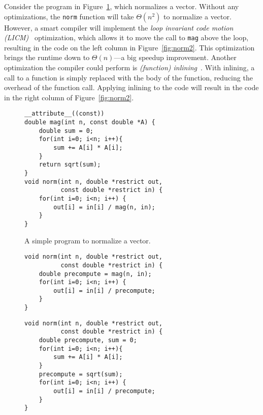 Consider the program in Figure~\ref{fig:norm1}, which normalizes a vector. Without any optimizations, the \verb|norm| function will take $\Theta(n^2)$ to normalize a vector. However, a smart compiler will implement the \textit{loop invariant code motion (LICM)}~\cite{Muchnick97} optimization, which allows it to move the call to \verb|mag| above the loop, resulting in the code on the left column in Figure~\ref{fig:norm2}. This optimization brings the runtime down to $\Theta(n)$---a big speedup improvement. Another optimization the compiler could perform is \textit{(function) inlining}~\cite{Muchnick97}. With inlining, a call to a function is simply replaced with the body of the function, reducing the overhead of the function call. Applying inlining to the code 
will result in the code in the right column of Figure~\ref{fig:norm2}.
\begin{figure}[H]
     \centering
         \centering
\begin{verbatim}
__attribute__((const))
double mag(int n, const double *A) {
    double sum = 0;
    for(int i=0; i<n; i++){
        sum += A[i] * A[i];
    }
    return sqrt(sum);
}
void norm(int n, double *restrict out,
          const double *restrict in) {
    for(int i=0; i<n; i++) {
        out[i] = in[i] / mag(n, in);
    }
}
\end{verbatim}
\caption{A simple program to normalize a vector. }
    \label{fig:norm1}
\end{figure}
\begin{figure*}[h]
     \centering
     \begin{subfigure}[b]{0.46\textwidth}
         \centering
\begin{verbatim}
void norm(int n, double *restrict out,
          const double *restrict in) {
    double precompute = mag(n, in);
    for(int i=0; i<n; i++) {
        out[i] = in[i] / precompute;
    }
}
\end{verbatim}
\end{subfigure}
     \hfill
     \begin{subfigure}[b]{0.46\textwidth}
         \centering
\begin{verbatim}
void norm(int n, double *restrict out,
          const double *restrict in) {
    double precompute, sum = 0;
    for(int i=0; i<n; i++){
        sum += A[i] * A[i];
    }
    precompute = sqrt(sum);
    for(int i=0; i<n; i++) {
        out[i] = in[i] / precompute;
    }
}
\end{verbatim}
     \end{subfigure}
     \caption{Progressively applying LICM (left) then inlining (right) to the code in Figure~\ref{fig:norm1}.}
    \label{fig:norm2}
\end{figure*}
